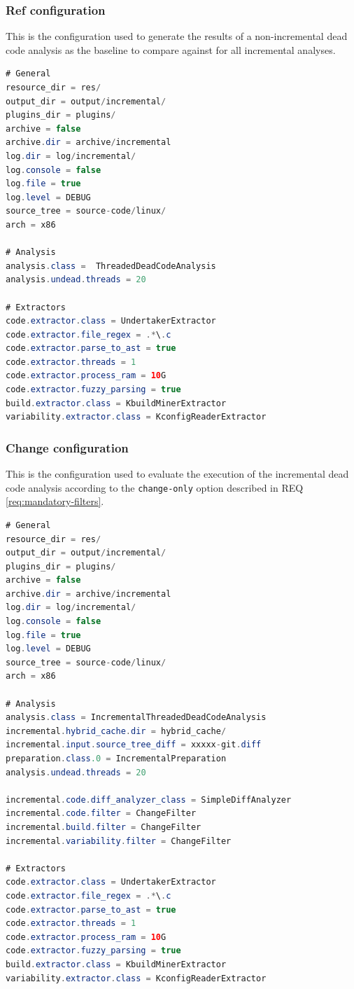 \documentclass[a4paper]{article}
\begin{document}
\subsubsection{Ref configuration}

This is the configuration used to generate the results of a non-incremental dead code analysis as the baseline to compare against for all incremental analyses.

\begin{lstlisting}[language=java]
# General
resource_dir = res/
output_dir = output/incremental/
plugins_dir = plugins/
archive = false
archive.dir = archive/incremental
log.dir = log/incremental/
log.console = false
log.file = true
log.level = DEBUG
source_tree = source-code/linux/
arch = x86

# Analysis  
analysis.class =  ThreadedDeadCodeAnalysis
analysis.undead.threads = 20

# Extractors  
code.extractor.class = UndertakerExtractor
code.extractor.file_regex = .*\.c
code.extractor.parse_to_ast = true
code.extractor.threads = 1
code.extractor.process_ram = 10G
code.extractor.fuzzy_parsing = true
build.extractor.class = KbuildMinerExtractor
variability.extractor.class = KconfigReaderExtractor
\end{lstlisting}

\clearpage


\subsubsection{Change configuration}

This is the configuration used to evaluate the execution of the incremental dead code analysis according to the \texttt{change-only} option described in  REQ \ref{req:mandatory-filters}.

\begin{lstlisting}[language=java]
# General
resource_dir = res/
output_dir = output/incremental/
plugins_dir = plugins/
archive = false
archive.dir = archive/incremental
log.dir = log/incremental/
log.console = false
log.file = true
log.level = DEBUG
source_tree = source-code/linux/
arch = x86

# Analysis  
analysis.class = IncrementalThreadedDeadCodeAnalysis
incremental.hybrid_cache.dir = hybrid_cache/
incremental.input.source_tree_diff = xxxxx-git.diff
preparation.class.0 = IncrementalPreparation
analysis.undead.threads = 20

incremental.code.diff_analyzer_class = SimpleDiffAnalyzer
incremental.code.filter = ChangeFilter
incremental.build.filter = ChangeFilter
incremental.variability.filter = ChangeFilter

# Extractors  
code.extractor.class = UndertakerExtractor
code.extractor.file_regex = .*\.c
code.extractor.parse_to_ast = true
code.extractor.threads = 1
code.extractor.process_ram = 10G
code.extractor.fuzzy_parsing = true
build.extractor.class = KbuildMinerExtractor
variability.extractor.class = KconfigReaderExtractor
\end{lstlisting}
\end{document}
